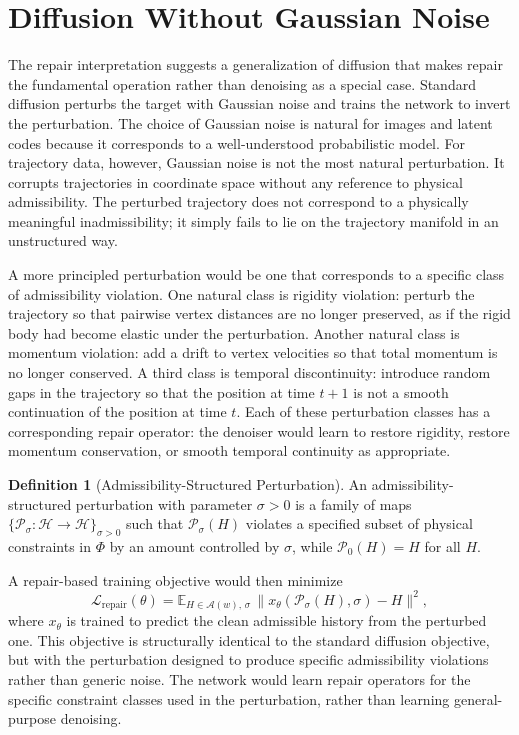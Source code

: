 \documentclass[12pt,oneside]{article}
\theoremstyle{definition}
\newtheorem{definition}[theorem]{Definition}
\newcommand{\A}{\mathcal{A}}
\newcommand{\H}{\mathcal{H}}
\begin{document}
\section{Diffusion Without Gaussian Noise}

The repair interpretation suggests a generalization of diffusion that makes repair
the fundamental operation rather than denoising as a special case. Standard diffusion
perturbs the target with Gaussian noise and trains the network to invert the
perturbation. The choice of Gaussian noise is natural for images and latent codes
because it corresponds to a well-understood probabilistic model. For trajectory data,
however, Gaussian noise is not the most natural perturbation. It corrupts trajectories
in coordinate space without any reference to physical admissibility. The perturbed
trajectory does not correspond to a physically meaningful inadmissibility; it simply
fails to lie on the trajectory manifold in an unstructured way.

A more principled perturbation would be one that corresponds to a specific class of
admissibility violation. One natural class is rigidity violation: perturb the trajectory
so that pairwise vertex distances are no longer preserved, as if the rigid body had
become elastic under the perturbation. Another natural class is momentum violation:
add a drift to vertex velocities so that total momentum is no longer conserved. A
third class is temporal discontinuity: introduce random gaps in the trajectory so that
the position at time \(t+1\) is not a smooth continuation of the position at time \(t\).
Each of these perturbation classes has a corresponding repair operator: the denoiser
would learn to restore rigidity, restore momentum conservation, or smooth temporal
continuity as appropriate.

\begin{definition}[Admissibility-Structured Perturbation]
An admissibility-structured perturbation with parameter \(\sigma > 0\) is a family
of maps \(\{\mathcal{P}_\sigma : \H \to \H\}_{{\sigma > 0}}\) such that
\(\mathcal{P}_\sigma(H)\) violates a specified subset of physical constraints in
\(\Phi\) by an amount controlled by \(\sigma\), while \(\mathcal{P}_0(H) = H\)
for all \(H\).
\end{definition}

A repair-based training objective would then minimize
\[
\mathcal{L}_{\text{repair}}(\theta) = \mathbb{E}_{H \in \A(w),\, \sigma}\,
\| x_\theta(\mathcal{P}_\sigma(H), \sigma) - H \|^2,
\]
where \(x_\theta\) is trained to predict the clean admissible history from the
perturbed one. This objective is structurally identical to the standard diffusion
objective, but with the perturbation designed to produce specific admissibility
violations rather than generic noise. The network would learn repair operators for
the specific constraint classes used in the perturbation, rather than learning
general-purpose denoising.
\end{document}
